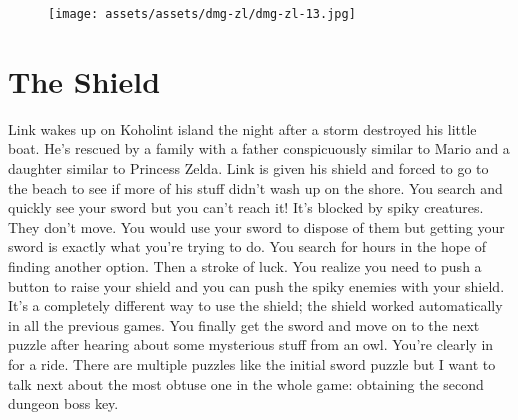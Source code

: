 \documentclass{book}
\let\oldcenter\center
\let\oldendcenter\endcenter
\renewenvironment{center}{\setlength\topsep{0pt}\oldcenter}{\oldendcenter}
\begin{document}
\begin{center}
\vspace{8pt}
\quad\vspace{4pt}
\quad\vspace{4pt}
\quad\vspace{4pt}
\quad\vspace{4pt}
\quad\vspace{4pt}
\quad\vspace{4pt}
\quad\vspace{4pt}
\end{center}

\begin{figure}[hbt]
\vskip 10pt
\centering \texttt{[image: assets/assets/dmg-zl/dmg-zl-13.jpg]}
\vskip 6pt
\end{figure}

\FloatBarrier\needspace{5pt}\section*{The Shield}\nopagebreak[4]

Link wakes up on Koholint island the night after a storm destroyed his little boat. He’s rescued by a family with a father conspicuously similar to Mario and a daughter similar to Princess Zelda. Link is given his shield and forced to go to the beach to see if more of his stuff didn’t wash up on the shore. You search and quickly see your sword but you can’t reach it! It’s blocked by spiky creatures. They don’t move. You would use your sword to dispose of them but getting your sword is exactly what you’re trying to do. You search for hours in the hope of finding another option. Then a stroke of luck. You realize you need to push a button to raise your shield and you can push the spiky enemies with your shield. It’s a completely different way to use the shield; the shield worked automatically in all the previous games. You finally get the sword and move on to the next puzzle after hearing about some mysterious stuff from an owl. You’re clearly in for a ride. There are multiple puzzles like the initial sword puzzle but I want to talk next about the most obtuse one in the whole game: obtaining the second dungeon boss key.
\end{document}
